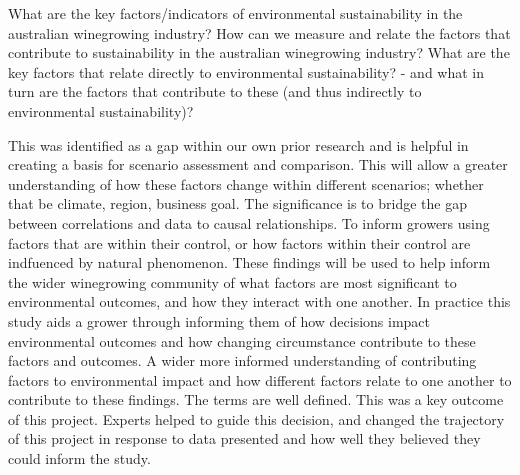 


%



What are the key factors/indicators of environmental sustainability in the australian winegrowing industry?
How can we measure and relate the factors that contribute to sustainability in the australian winegrowing industry?
What are the key factors that relate directly to environmental sustainability?
- and what in turn are the factors that contribute to these (and thus indirectly to environmental sustainability)?

%
This was identified as a gap within our own prior research and is helpful in creating a basis for scenario assessment and comparison. This will allow a greater understanding of how these factors change within different scenarios; whether that be climate, region, business goal.
The significance is to bridge the gap between correlations and data to causal relationships. To inform growers using factors that are within their control, or how factors within their control are indfuenced by natural phenomenon.
These findings will be used to help inform the wider winegrowing community of what factors are most significant to environmental outcomes, and how they interact with one another. In practice this study aids a grower through informing them of how decisions impact environmental outcomes and how changing circumstance contribute to these factors and outcomes.
A wider more informed understanding of contributing factors to environmental impact and how different factors relate to one another to contribute to these findings.
The terms are well defined. This was a key outcome of this project.
Experts helped to guide this decision, and changed the trajectory of this project in response to data presented and how well they believed they could inform the study.

